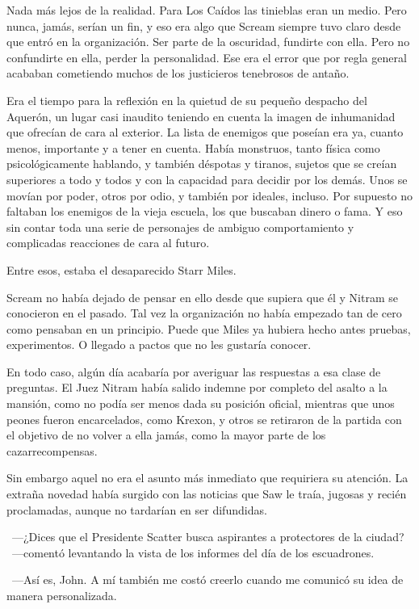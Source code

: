 Nada más lejos de la realidad. Para Los Caídos las tinieblas eran un medio. Pero nunca, jamás, serían un fin, y eso era algo que Scream siempre tuvo claro desde que entró en la organización. Ser parte de la oscuridad, fundirte con ella. Pero no confundirte en ella, perder la personalidad. Ese era el error que por regla general acababan cometiendo muchos de los justicieros tenebrosos de antaño.

Era el tiempo para la reflexión en la quietud de su pequeño despacho del Aquerón, un lugar casi inaudito teniendo en cuenta la imagen de inhumanidad que ofrecían de cara al exterior. La lista de enemigos que poseían era ya, cuanto menos, importante y a tener en cuenta. Había monstruos, tanto física como psicológicamente hablando, y también déspotas y tiranos, sujetos que se creían superiores a todo y todos y con la capacidad para decidir por los demás. Unos se movían por poder, otros por odio, y también por ideales, incluso. Por supuesto no faltaban los enemigos de la vieja escuela, los que buscaban dinero o fama. Y eso sin contar toda una serie de personajes de ambiguo comportamiento y complicadas reacciones de cara al futuro.

Entre esos, estaba el desaparecido Starr Miles.

Scream no había dejado de pensar en ello desde que supiera que él y Nitram se conocieron en el pasado. Tal vez la organización no había empezado tan de cero como pensaban en un principio. Puede que Miles ya hubiera hecho antes pruebas, experimentos. O llegado a pactos que no les gustaría conocer.

En todo caso, algún día acabaría por averiguar las respuestas a esa clase de preguntas. El Juez Nitram había salido indemne por completo del asalto a la mansión, como no podía ser menos dada su posición oficial, mientras que unos peones fueron encarcelados, como Krexon, y otros se retiraron de la partida con el objetivo de no volver a ella jamás, como la mayor parte de los cazarrecompensas.

Sin embargo aquel no era el asunto más inmediato que requiriera su atención. La extraña novedad había surgido con las noticias que Saw le traía, jugosas y recién proclamadas, aunque no tardarían en ser difundidas.

~---¿Dices que el Presidente Scatter busca aspirantes a protectores de la ciudad? ~---comentó levantando la vista de los informes del día de los escuadrones.

~---Así es, John. A mí también me costó creerlo cuando me comunicó su idea de manera personalizada.

